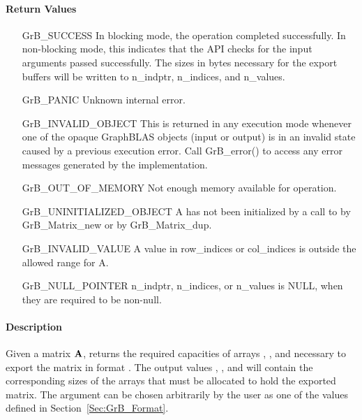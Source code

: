 \paragraph{Return Values}

\begin{itemize}[leftmargin=2.3in]
    \item[{\sf GrB\_SUCCESS}]         In blocking mode, the operation completed
    successfully. In non-blocking mode, this indicates that the API checks 
    for the input arguments passed successfully. The sizes in bytes necessary
    for the export buffers will be written to {\sf n\_indptr}, {\sf n\_indices},
    and {\sf n\_values}.

    \item[{\sf GrB\_PANIC}]           Unknown internal error.
    
    \item[{\sf GrB\_INVALID\_OBJECT}] This is returned in any execution mode 
    whenever one of the opaque GraphBLAS objects (input or output) is in an invalid 
    state caused by a previous execution error.  Call {\sf GrB\_error()} to access 
    any error messages generated by the implementation.

    \item[{\sf GrB\_OUT\_OF\_MEMORY}] Not enough memory available for operation.
    
    \item[{\sf GrB\_UNINITIALIZED\_OBJECT}]  {\sf A} has not been 
    initialized by a call to {\sf by GrB\_Matrix\_new} or 
    {\sf by GrB\_Matrix\_dup}.

    \item[{\sf GrB\_INVALID\_VALUE}] A value in {\sf row\_indices} or
    {\sf col\_indices} is outside the allowed range for {\sf A}.
    
    \item[{\sf GrB\_NULL\_POINTER}]  {\sf n\_indptr}, 
    {\sf n\_indices}, or {\sf n\_values} is {\sf NULL},
    when they are required to be non-null.
\end{itemize}

\paragraph{Description}

Given a matrix ${\bf A}$, returns the required capacities of arrays ,
, and  necessary to export the matrix in format .
The output values , , and  will
contain the corresponding sizes of the arrays that must be allocated to hold
the exported matrix.  The argument  can be chosen arbitrarily by the
user as one of the values defined in Section~\ref{Sec:GrB_Format}.

